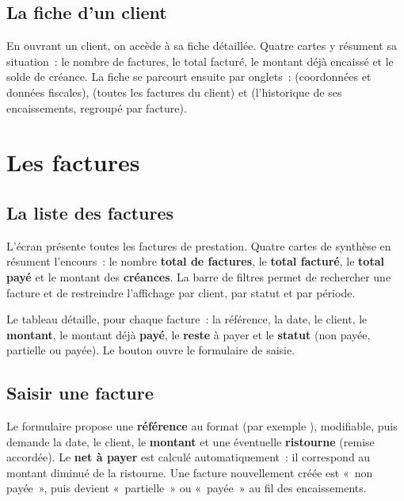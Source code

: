 \section{La fiche d'un client}
En ouvrant un client, on accède à sa fiche détaillée. Quatre cartes y résument sa situation~: le nombre de factures, le total facturé, le montant déjà encaissé et le solde de créance. La fiche se parcourt ensuite par onglets~:  (coordonnées et données fiscales),  (toutes les factures du client) et  (l'historique de ses encaissements, regroupé par facture).


\chapter{Les factures}

\section{La liste des factures}
L'écran  présente toutes les factures de prestation. Quatre cartes de synthèse en résument l'encours~: le nombre \textbf{total de factures}, le \textbf{total facturé}, le \textbf{total payé} et le montant des \textbf{créances}. La barre de filtres permet de rechercher une facture et de restreindre l'affichage par client, par statut et par période.

Le tableau détaille, pour chaque facture~: la référence, la date, le client, le \textbf{montant}, le montant déjà \textbf{payé}, le \textbf{reste} à payer et le \textbf{statut} (non payée, partielle ou payée). Le bouton  ouvre le formulaire de saisie.


\section{Saisir une facture}
Le formulaire propose une \textbf{référence} au format  (par exemple ), modifiable, puis demande la date, le client, le \textbf{montant} et une éventuelle \textbf{ristourne} (remise accordée). Le \textbf{net à payer} est calculé automatiquement~: il correspond au montant diminué de la ristourne. Une facture nouvellement créée est «~non payée~», puis devient «~partielle~» ou «~payée~» au fil des encaissements.

